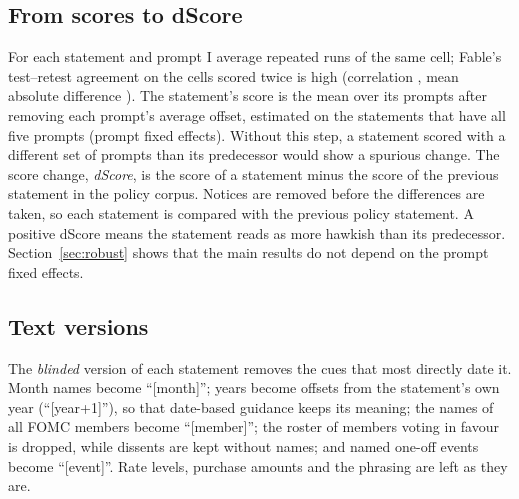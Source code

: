 \begin{table}[t]
\centering
\caption{Scoring runs}\label{tab:runs}
\footnotesize
\setlength{\tabcolsep}{4pt}

\end{table}

\subsection{From scores to dScore}

For each statement and prompt I average repeated runs of the same cell; Fable's test--retest agreement on
the  cells scored twice is high (correlation , mean absolute difference
). The statement's score is the mean over its prompts after removing each prompt's average
offset, estimated on the statements that have all five prompts (prompt fixed effects). Without this
step, a statement scored with a different set of prompts than its predecessor would show a spurious
change. The score change, \emph{dScore}, is the score of a statement minus the score of the previous
statement in the policy corpus. Notices are removed before the differences are taken, so each statement
is compared with the previous policy statement. A positive dScore means the statement reads as more
hawkish than its predecessor. Section~\ref{sec:robust} shows that the main results do not depend on
the prompt fixed effects.

\subsection{Text versions}\label{sec:versions}

The \emph{blinded} version of each statement removes the cues that most directly date it. Month names
become ``[month]''; years become offsets from the statement's own year (``[year+1]''), so that date-based
guidance keeps its meaning; the names of all FOMC members become ``[member]''; the roster of members
voting in favour is dropped, while dissents are kept without names; and named one-off events become
``[event]''. Rate levels, purchase amounts and the phrasing are left as they are.

